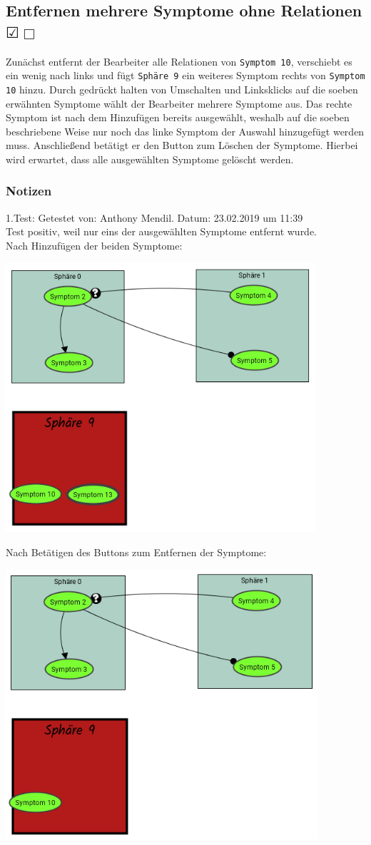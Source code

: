 \documentclass[enabledeprecatedfontcommands]{scrartcl}
\newcommand{\subsectiont}[2]{\subsection[#1]{#1{\normalsize\normalfont #2}}}
\newcommand{\leer}{$\Box$}
\newcommand{\ok}{$\CheckedBox$}
\begin{document}
\subsectiont{Entfernen mehrere Symptome ohne Relationen}{\dotfill\XBox\ok\leer}
Zunächst entfernt der Bearbeiter alle Relationen von \texttt{Symptom 10}, verschiebt es ein wenig nach links und fügt \texttt{Sphäre 9} ein weiteres Symptom rechts von \texttt{Symptom 10} hinzu. 
Durch gedrückt halten von Umschalten und Linksklicks auf die soeben erwähnten Symptome wählt der Bearbeiter mehrere Symptome aus. Das rechte Symptom ist nach dem Hinzufügen bereits ausgewählt, weshalb auf die soeben beschriebene Weise nur noch das linke Symptom der Auswahl hinzugefügt werden muss. Anschließend betätigt er den Button zum Löschen der Symptome. Hierbei wird erwartet, dass alle ausgewählten Symptome gelöscht werden. 
\subsubsection{Notizen}
1.Test: Getestet von: Anthony Mendil. Datum: 23.02.2019 um 11:39 \\
Test positiv, weil nur eins der ausgewählten Symptome entfernt wurde. \\
Nach Hinzufügen der beiden Symptome: 
\begin{center}
\includegraphics[height=10cm]{2_22vorher.PNG}
\end{center}
Nach Betätigen des Buttons zum Entfernen der Symptome: 
\begin{center}
\includegraphics[height=10cm]{2_22nachher.PNG}
\end{center}
\end{document}
